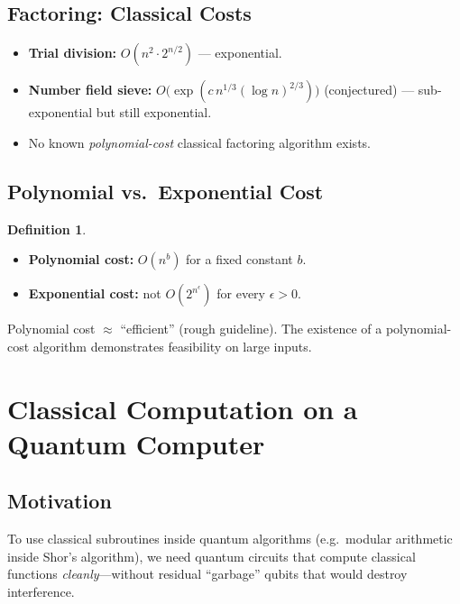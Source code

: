\documentclass[11pt]{article}
\theoremstyle{definition}
\newtheorem{definition}{Definition}[section]
\begin{document}
\subsection{Factoring: Classical Costs}

\begin{itemize}
    \item \textbf{Trial division:} $O(n^2\cdot 2^{n/2})$ --- exponential.
    \item \textbf{Number field sieve:} $O\!\bigl(\exp(c\,n^{1/3}(\log n)^{2/3})\bigr)$ (conjectured) --- sub-exponential but still exponential.
    \item No known \emph{polynomial-cost} classical factoring algorithm exists.
\end{itemize}

\subsection{Polynomial vs.\ Exponential Cost}

\begin{definition}\leavevmode
\begin{itemize}
    \item \textbf{Polynomial cost:} $O(n^b)$ for a fixed constant $b$.
    \item \textbf{Exponential cost:} not $O(2^{n^\epsilon})$ for every $\epsilon>0$.
\end{itemize}
\end{definition}

Polynomial cost $\approx$ ``efficient'' (rough guideline).  The existence of a polynomial-cost algorithm demonstrates feasibility on large inputs.

\section{Classical Computation on a Quantum Computer}

\subsection{Motivation}

To use classical subroutines inside quantum algorithms (e.g.\ modular arithmetic inside Shor's algorithm), we need quantum circuits that compute classical functions \emph{cleanly}---without residual ``garbage'' qubits that would destroy interference.
\end{document}
